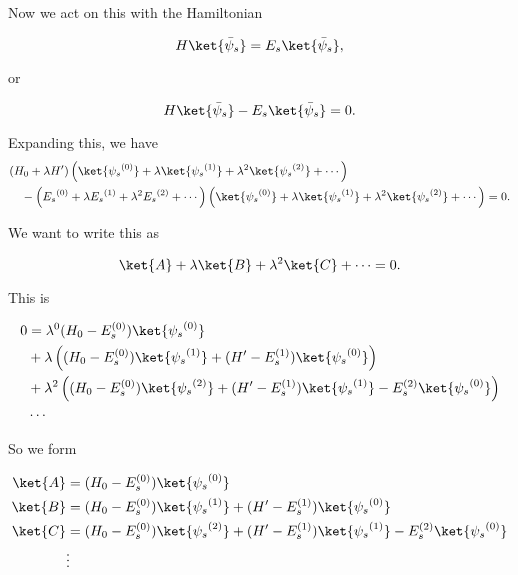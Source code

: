 Now we act on this with the Hamiltonian

\begin{equation}\label{eqn:qmTwoL4:340}
H \ket{\bar{\psi}_s} = E_s \ket{\bar{\psi}_s},
\end{equation}

or

\begin{equation}\label{eqn:qmTwoL4:360}
H \ket{\bar{\psi}_s} - E_s \ket{\bar{\psi}_s} = 0.
\end{equation}

Expanding this, we have
\begin{equation}\label{eqn:qmTwoL4:380}
\begin{aligned}
&(H_0 + \lambda H') 
\left(
\ket{{\psi_s}^{(0)}} 
+ 
\lambda \ket{{\psi_s}^{(1)}} 
+ 
\lambda^2 \ket{{\psi_s}^{(2)}} 
+ \cdots
\right) \\
&\quad - 
\left( {E_s}^{(0)} + \lambda {E_s}^{(1)} + \lambda^2 {E_s}^{(2)} + \cdots \right)
\left(
\ket{{\psi_s}^{(0)}} 
+ 
\lambda \ket{{\psi_s}^{(1)}} 
+ 
\lambda^2 \ket{{\psi_s}^{(2)}} 
+ \cdots
\right)
= 0.
\end{aligned}
\end{equation}

We want to write this as

\begin{equation}\label{eqn:qmTwoL4:400}
\ket{A} + \lambda \ket{B} + \lambda^2 \ket{C} + \cdots = 0.
\end{equation}

This is

\begin{equation}\label{eqn:qmTwoL4:420}
\begin{aligned}
0 &=
\lambda^0
(H_0 - E_s^{(0)}) \ket{{\psi_s}^{(0)}}  \\
&+ \lambda
\left(
(H_0 - E_s^{(0)}) \ket{{\psi_s}^{(1)}} 
+(H' - E_s^{(1)}) \ket{{\psi_s}^{(0)}} 
\right) \\
&+ \lambda^2
\left(
(H_0 - E_s^{(0)}) \ket{{\psi_s}^{(2)}} 
+(H' - E_s^{(1)}) \ket{{\psi_s}^{(1)}} 
-E_s^{(2)} \ket{{\psi_s}^{(0)}} 
\right) \\
&\cdots
\end{aligned}
\end{equation}

So we form

\begin{align}\label{eqn:qmTwoL4:440}
\ket{A} &=
(H_0 - E_s^{(0)}) \ket{{\psi_s}^{(0)}} \\
\ket{B} &=
(H_0 - E_s^{(0)}) \ket{{\psi_s}^{(1)}} 
+(H' - E_s^{(1)}) \ket{{\psi_s}^{(0)}} \\
\ket{C} &=
(H_0 - E_s^{(0)}) \ket{{\psi_s}^{(2)}} 
+(H' - E_s^{(1)}) \ket{{\psi_s}^{(1)}} 
-E_s^{(2)} \ket{{\psi_s}^{(0)}}  \\
&\vdots
\end{align}

